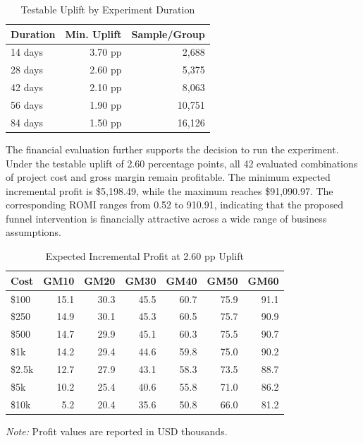 \documentclass[conference]{IEEEtran}
\begin{document}
\begin{table}[H]
\centering
\caption{Testable Uplift by Experiment Duration}
\label{tab:testable_mde_duration}

\renewcommand{\arraystretch}{1.1}
\setlength{\tabcolsep}{3pt}
\scriptsize

\begin{tabular*}{\columnwidth}{|@{\hspace{4pt}\extracolsep{\fill}}lrr@{\hspace{4pt}}|}
\toprule
\textbf{Duration} & \textbf{Min. Uplift} & \textbf{Sample/Group} \\
\midrule
14 days & 3.70 pp & 2,688 \\
28 days & 2.60 pp & 5,375 \\
42 days & 2.10 pp & 8,063 \\
56 days & 1.90 pp & 10,751 \\
84 days & 1.50 pp & 16,126 \\
\bottomrule
\end{tabular*}
\end{table}

The financial evaluation further supports the decision to run the experiment. Under the testable uplift of 2.60 percentage points, all 42 evaluated combinations of project cost and gross margin remain profitable. The minimum expected incremental profit is \$5,198.49, while the maximum reaches \$91,090.97. The corresponding ROMI ranges from 0.52 to 910.91, indicating that the proposed funnel intervention is financially attractive across a wide range of business assumptions.

\begin{table}[H]
\centering
\caption{Expected Incremental Profit at 2.60 pp Uplift}
\label{tab:funnel_incremental_profit_mde}

\renewcommand{\arraystretch}{1.05}
\setlength{\tabcolsep}{2.5pt}
\scriptsize

\begin{tabular*}{\columnwidth}{|@{\hspace{4pt}\extracolsep{\fill}}lrrrrrr@{\hspace{4pt}}|}
\toprule
\textbf{Cost} & \textbf{GM10} & \textbf{GM20} & \textbf{GM30} & \textbf{GM40} & \textbf{GM50} & \textbf{GM60} \\
\midrule
\$100 & 15.1 & 30.3 & 45.5 & 60.7 & 75.9 & 91.1 \\
\$250 & 14.9 & 30.1 & 45.3 & 60.5 & 75.7 & 90.9 \\
\$500 & 14.7 & 29.9 & 45.1 & 60.3 & 75.5 & 90.7 \\
\$1k & 14.2 & 29.4 & 44.6 & 59.8 & 75.0 & 90.2 \\
\$2.5k & 12.7 & 27.9 & 43.1 & 58.3 & 73.5 & 88.7 \\
\$5k & 10.2 & 25.4 & 40.6 & 55.8 & 71.0 & 86.2 \\
\$10k & 5.2 & 20.4 & 35.6 & 50.8 & 66.0 & 81.2 \\
\bottomrule
\end{tabular*}
\vspace{1pt}

\scriptsize{\textit{Note:} Profit values are reported in USD thousands.}
\end{table}
\end{document}
